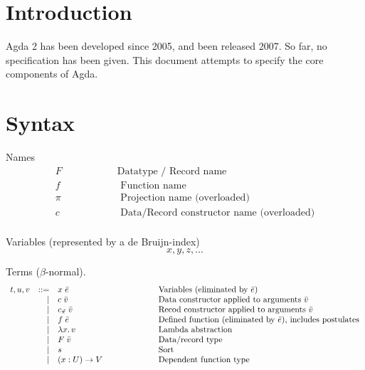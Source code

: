 \documentclass[acmlarge]{acmart}\settopmatter{}
\renewcommand{\|}{\mid}
\begin{document}
\section{Introduction}

Agda 2 has been developed since 2005, and been released 2007.  So far,
no specification has been given.  This document attempts to specify
the core components of Agda.


\section{Syntax}
\label{sec:syntax}

\newcommand{\bang}{\,!\,}
\newcommand{\twobang}{\,!!\,}


Names
\[
\begin{array}{ll}
  F & \hspace{2cm}\text{Datatype / Record name} \\
  f & \hspace{2cm}\text{   Function name} \\
\pi & \hspace{2cm}\text{  Projection name  (overloaded)} \\
  c & \hspace{2cm}\text{   Data/Record constructor name (overloaded)} \\
\end{array}
\]

Variables (represented by a de Bruijn-index)
\[
x,y,z, \hdots
\]

Terms ($\beta$-normal).
\[
\begin{array}{lrll}
t, u, v &::=& x\; \bar{e}            & \hspace{2cm}\text{Variables (eliminated by $\bar{e}$)} \\
          &|& c\; \bar{v}            & \hspace{2cm}\text{Data constructor applied to arguments $\bar{v}$} \\
          &|& c_{\vec\pi}\; \bar{v}         & \hspace{2cm}\text{Recod constructor applied to arguments $\bar{v}$} \\
          &|& f\; \bar{e}            & \hspace{2cm}\text{Defined function (eliminated by $\bar{e}$), includes postulates} \\
          &|& \lambda x.\, v         & \hspace{2cm}\text{Lambda abstraction} \\
          &|& F\; \bar{v}            & \hspace{2cm}\text{Data/record type} \\
          &|& s               & \hspace{2cm}\text{Sort} \\
          &|& (x : U) \rightarrow V      & \hspace{2cm}\text{Dependent function type} \\
\end{array}
\]
\end{document}
